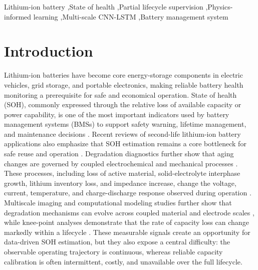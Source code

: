 \documentclass[a4paper,fleqn]{cas-dc}
\begin{document}
\begin{keywords}
Lithium-ion battery \sep State of health \sep Partial lifecycle supervision \sep Physics-informed learning \sep Multi-scale CNN-LSTM \sep Battery management system
\end{keywords}

\maketitle

\section{Introduction}

Lithium-ion batteries have become core energy-storage components in electric vehicles, grid storage, and portable electronics, making reliable battery health monitoring a prerequisite for safe and economical operation. State of health (SOH), commonly expressed through the relative loss of available capacity or power capability, is one of the most important indicators used by battery management systems (BMSs) to support safety warning, lifetime management, and maintenance decisions \cite{berecibar2016critical}. Recent reviews of second-life lithium-ion battery applications also emphasize that SOH estimation remains a core bottleneck for safe reuse and operation \cite{vignesh2024state}. Degradation diagnostics further show that aging changes are governed by coupled electrochemical and mechanical processes \cite{birkl2017degradation}. These processes, including loss of active material, solid-electrolyte interphase growth, lithium inventory loss, and impedance increase, change the voltage, current, temperature, and charge-discharge response observed during operation \cite{che2023health}. Multiscale imaging and computational modeling studies further show that degradation mechanisms can evolve across coupled material and electrode scales \cite{zhang2023coupling}, while knee-point analyses demonstrate that the rate of capacity loss can change markedly within a lifecycle \cite{attia2022knees}. These measurable signals create an opportunity for data-driven SOH estimation, but they also expose a central difficulty: the observable operating trajectory is continuous, whereas reliable capacity calibration is often intermittent, costly, and unavailable over the full lifecycle.
\end{document}
